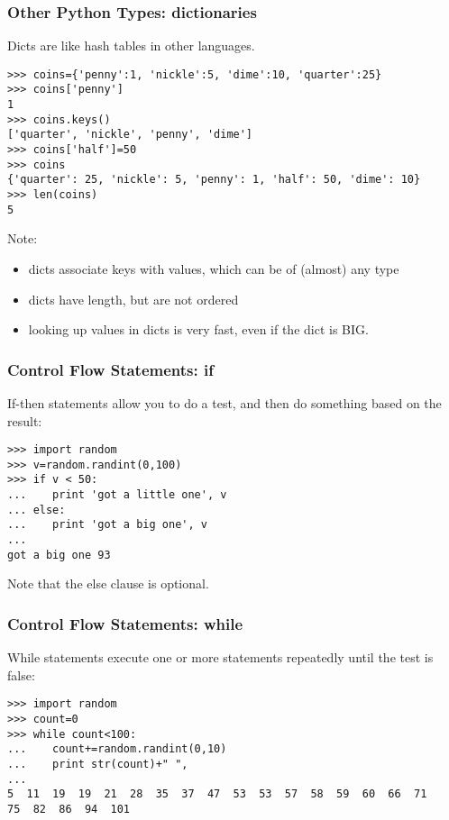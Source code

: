 \documentclass[10pt]{beamer}
\begin{document}
\begin{frame}[fragile]
\frametitle{Other Python Types: dictionaries}

Dicts are like hash tables in other languages.  
\begin{verbatim}
>>> coins={'penny':1, 'nickle':5, 'dime':10, 'quarter':25}
>>> coins['penny']
1
>>> coins.keys()
['quarter', 'nickle', 'penny', 'dime']
>>> coins['half']=50
>>> coins
{'quarter': 25, 'nickle': 5, 'penny': 1, 'half': 50, 'dime': 10}
>>> len(coins)
5
\end{verbatim}

Note:
\begin{itemize}
\item dicts associate keys with values, which can be of (almost) any type 
\item dicts have length, but are not ordered
\item looking up values in dicts is very fast, even if the dict is BIG.
\end{itemize}

\end{frame}

\begin{frame}[fragile]
\frametitle{Control Flow Statements: if}

If-then statements allow you to do a test, and then do something
based on the result:

\begin{verbatim}
>>> import random
>>> v=random.randint(0,100)
>>> if v < 50:
...    print 'got a little one', v
... else:
...    print 'got a big one', v
... 
got a big one 93
\end{verbatim}

Note that the else clause is optional.

\end{frame}

\begin{frame}[fragile]
\frametitle{Control Flow Statements: while}

While statements execute one or more statements repeatedly until the 
test is false:

\begin{verbatim}
>>> import random
>>> count=0
>>> while count<100:
...    count+=random.randint(0,10)
...    print str(count)+" ",
... 
5  11  19  19  21  28  35  37  47  53  53  57  58  59  60  66  71  
75  82  86  94  101 
\end{verbatim}

\end{frame}
\end{document}

